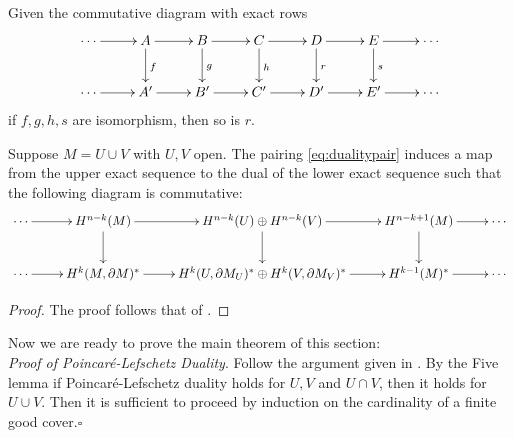\begin{lemma}
	Given the commutative diagram with exact rows
	\begin{equation}
	\xymatrix{
		\cdots \ar[r] &A \ar[d]^f \ar[r]  &B \ar[d]^g \ar[r] &C \ar[d]^h \ar[r] &D \ar[d]^r \ar[r] &E \ar[d]^s \ar[r] &\cdots\\
		\cdots \ar[r] &A' \ar[r]  &B' \ar[r] &C' \ar[r] &D' \ar[r] &E' \ar[r] &\cdots\\}
	\end{equation}
	if $f,g,h,s$ are isomorphism, then so is $r$.
	
\end{lemma}


\begin{lemma}
	Suppose $M=U\cup V$ with $U,V$ open. The pairing \eqref{eq:dualitypair} induces a map from the upper exact sequence to the dual of the lower exact sequence such that the following diagram is commutative:
	\begin{equation}
	\xymatrix{
		\cdots \ar[r] &H^{n-k}(M) \ar[d] \ar[r] &H^{n-k}(U)\oplus H^{n-k}(V)\ar[d]\ar[r] &H^{n-k+1}(M) \ar[d] \ar[r] &\cdots\\
		\cdots \ar[r] &H^{k}(M,\partial M)^*  \ar[r] &H^{k}(U,\partial M_U)^*\oplus H^{k}(V,\partial M_V)^*\ar[r] &H^{k-1}(M)^* \ar[r] &\cdots}
	\end{equation}
	
\end{lemma}


\begin{proof}
	The proof follows that of \cite[Lem. 5.6]{Bott-Tu-82}.
\end{proof}


\noindent Now we are ready to prove the main theorem of this section:\\

\noindent\textit{Proof of Poincar\'e-Lefschetz Duality}. Follow the argument given in \cite[Sec. 5]{Bott-Tu-82}. By the Five lemma if Poincar\'e-Lefschetz duality holds for $U,V$ and $U\cap V$, then it holds for $U\cup V$. Then it is sufficient to proceed by induction on the cardinality of a finite good cover.\hfill$\square$
